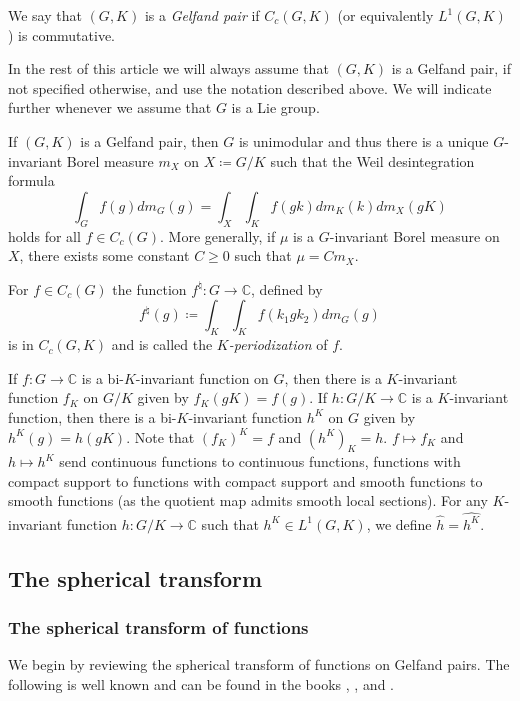 \documentclass[12pt,reqno,a4paper]{amsart}
\theoremstyle{theorem}
\theoremstyle{definition}
\numberwithin{theorem}{section}
\numberwithin{equation}{section}
\newcommand{\C}{\mathbb{C}}
\begin{document}
We say that $(G,K)$ is a \emph{Gelfand pair} if $C_c(G,K)$ (or equivalently $L^1(G, K)$) is commutative.

In the rest of this article we will always assume that $(G,K)$ is a Gelfand pair, if not specified otherwise, and use the notation described above. We will indicate further whenever we assume that $G$ is a Lie group.

If $(G, K)$ is a Gelfand pair, then $G$ is unimodular and thus there is a unique $G$-invariant Borel measure $m_X$ on $X\coloneqq G/K$ such that the Weil desintegration formula
\[\int_G f(g)dm_G(g) = \int_X\int_Kf(gk)dm_K(k)dm_X(gK)\]
holds for all $f\in C_c(G)$.
More generally, if $\mu$ is a $G$-invariant Borel measure on $X$, there exists some constant $C\geq0$ such that $\mu = Cm_X$.

For $f\in C_c(G)$ the function $f^\natural:G\to \C$, defined by
\[f^\natural(g)\coloneqq \int_K\int_K f(k_1gk_2)dm_G(g)\]
is in $C_c(G, K)$ and is called the \emph{$K$-periodization} of $f$.

If $f:G\to \C$ is a bi-$K$-invariant function on $G$, then there is a $K$-invariant function $f_K$ on $G/K$ given by $f_K(gK) = f(g)$.
If $h:G/K\to \C$ is a $K$-invariant function, then there is a bi-$K$-invariant function $h^K$ on $G$ given by $h^K(g) = h(gK).$
Note that $(f_K)^K=f$ and $(h^K)_K = h$. $f\mapsto f_K$ and $h\mapsto h^K$ send continuous functions to continuous functions, functions with compact support to functions with compact support and smooth functions to smooth functions (as the quotient map admits smooth local sections). 
For any $K$-invariant function $h:G/K\to \C$ such that $h^K\in L^1(G, K)$, we define $\widehat{h}=\widehat{h^K}$.	

\subsection{The spherical transform}
\subsubsection{The spherical transform of functions}
We begin by reviewing the spherical transform of functions on Gelfand pairs. The following is well known and can be found in the books \cite{Dieudonne}, \cite{VaradarajanGangolli}, \cite{vanDijk} and \cite{Wolf}. 
\end{document}
